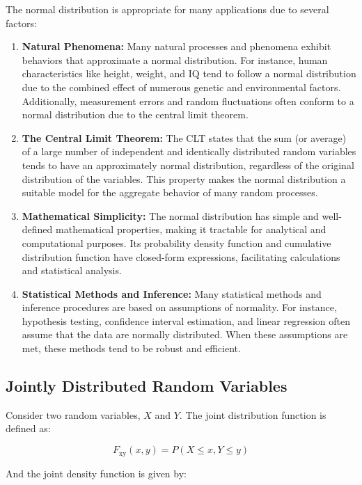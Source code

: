 \documentclass[12pt]{book}
\theoremstyle{definition}
\begin{document}
The normal distribution is appropriate for many applications due to several factors:

\begin{enumerate}
    \item \textbf{Natural Phenomena:} Many natural processes and phenomena exhibit behaviors that approximate a normal distribution. For instance, human characteristics like height, weight, and IQ tend to follow a normal distribution due to the combined effect of numerous genetic and environmental factors. Additionally, measurement errors and random fluctuations often conform to a normal distribution due to the central limit theorem.
    \item \textbf{The Central Limit Theorem:} The CLT states that the sum (or average) of a large number of independent and identically distributed random variables tends to have an approximately normal distribution, regardless of the original distribution of the variables. This property makes the normal distribution a suitable model for the aggregate behavior of many random processes.
    \item \textbf{Mathematical Simplicity:} The normal distribution has simple and well-defined mathematical properties, making it tractable for analytical and computational purposes. Its probability density function and cumulative distribution function have closed-form expressions, facilitating calculations and statistical analysis.
    \item \textbf{Statistical Methods and Inference:} Many statistical methods and inference procedures are based on assumptions of normality. For instance, hypothesis testing, confidence interval estimation, and linear regression often assume that the data are normally distributed. When these assumptions are met, these methods tend to be robust and efficient.
    
\end{enumerate}





\subsection{Jointly Distributed Random Variables}

Consider two random variables, \(X\) and \(Y\). The joint distribution function is defined as:

\[
F_\mathrm{xy}(x, y) = P(X \leq x, Y \leq y)
\]

And the joint density function is given by:
\end{document}
